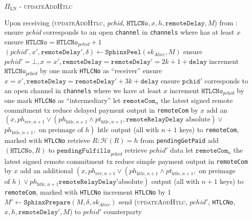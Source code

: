 \begin{protocolbox}{$\Pi_{\mathrm{LN}}$ - \textsc{updateAddHtlc}}
  \label{alg:protocol:pay:updateAddHtlc}
  \begin{algorithmic}[1]
    \State Upon receiving (\textsc{updateAddHtlc}, \textit{pchid},
    $\mathtt{HTLCNo}, x, h, \mathtt{remoteDelay}, M$) from \bob:
    \Indent
      \State ensure \textit{pchid} corresponds to an open \texttt{channel} in
      \texttt{channels} where \bob{} has at least $x$
      \State ensure $\mathtt{HTLCNo} = \mathtt{HTLCNo}_{\mathit{pchid}} + 1$
      \State $\left(\mathit{pchid}', x', \mathtt{remoteDelay}', \delta\right)
      \gets
      \mathtt{SphinxPeel}\left(sk_{\textit{Alice}}, M\right)$
        \State ensure $\mathit{pchid}' = \bot, x = x', \mathtt{remoteDelay} =
        \mathtt{remoteDelay}' = 2k + 1 + \mathtt{delay}$
        \State increment $\mathtt{HTLCNo}_{\textit{pchid}}$ by one
        \State mark \texttt{HTLCNo} as ``receiver''
      \Else {}
        \State ensure $x = x', \mathtt{remoteDelay} = \mathtt{remoteDelay}' + 3k
        + \mathtt{delay}$
        \State ensure $\mathtt{pchid}'$ corresponds to an open channel in
        \texttt{channels} where we have at least $x$
        \State increment $\mathtt{HTLCNo}_{\textit{pchid}}$ by one
        \State mark \texttt{HTLCNo} as ``intermediary''
      \EndIf
      \State let $\mathtt{remoteCom}_n$ the latest signed remote commitment tx
      \State reduce delayed payment output in \texttt{remoteCom} by $x$
      \State add an $\left(x, ph_{\mathrm{rev}, n+1} \vee
      \left(ph_{\mathrm{htlc}, n+1} \wedge pt_{\mathrm{htlc}, n+1},
      \mathtt{remoteRelayDelay} \text{ absolute}\right) \vee\right.$
      $\left.ph_{\mathrm{htlc}, n+1}, \text{ on preimage of } h\right)$ htlc
      output (all with $n+1$ keys) to \texttt{remoteCom}, marked with
      \texttt{HTLCNo}
        \State retrieve $R : \mathcal{H}\left(R\right) = h$ from
        \texttt{pendingGetPaid}
        \State add $\left(\mathtt{HTLCNo}, R\right)$ to
        $\mathtt{pendingFulfills}_{\textit{pchid}}$
       
        \State retrieve $\mathit{pchid}'$ data
        \State let $\mathtt{remoteCom}_n$ the latest signed remote commitment tx
        \State reduce simple payment output in \texttt{remoteCom} by $x$
        \State add an additional $\left(x, ph_{\mathrm{rev}, n+1} \vee
        \left(ph_{\mathrm{htlc}, n+1} \wedge pt_{\mathrm{htlc}, n+1}, \text{ on
        preimage}\right.\right.$ $\left.\left.\text{of } h\right) \vee
        ph_{\mathrm{htlc}, n+1}\mathtt{remoteRelayDelay}' \text{
        absolute}\right)$ output (all with $n+1$ keys) to \texttt{remoteCom},
        marked with \texttt{HTLCNo}
        \State increment \texttt{HTLCNo} by 1
        \State $M' \gets \mathtt{SphinxPrepare}\left(M, \delta,
        sk_{\mathit{Alice}}\right)$
        \State send (\textsc{updateAddHtlc}, $\mathit{pchid}'$, \texttt{HTLCNo},
        $x, h, \mathtt{remoteDelay}', M$) to $\mathit{pchid}'$ counterparty
      \EndIf
    \EndIndent
  \end{algorithmic}
\end{protocolbox}

